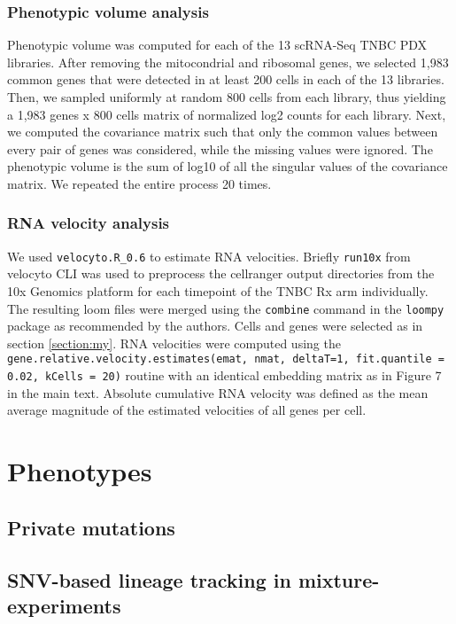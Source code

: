 \documentclass{article}
\begin{document}
\subsubsection{Phenotypic volume analysis}
\label{sec:phvolume}

Phenotypic volume \cite{azizi2018single} was computed for each of the 13 scRNA-Seq TNBC PDX libraries. After removing the mitocondrial and ribosomal genes, we selected 1,983 common genes that were detected in at least 200 cells in each of the 13 libraries. Then, we sampled uniformly at random 800 cells from each library, thus yielding a 1,983 genes x 800 cells matrix of normalized log2 counts for each library. Next, we computed the  covariance matrix such that only the common values between every pair of genes was considered, while the missing values were ignored. The phenotypic volume is the sum of log10 of all the singular values of the covariance matrix. We repeated the entire process 20 times.


\subsubsection{RNA velocity analysis}
We used \verb|velocyto.R_0.6| \cite{la2018rna} to estimate RNA velocities. 
Briefly  \verb|run10x| from velocyto CLI was used to preprocess the cellranger output directories from the 10x Genomics platform for each timepoint of the TNBC Rx arm individually. 
The resulting loom files were merged using the \verb|combine| command in the \verb|loompy| package as recommended by the authors. 
Cells and genes were selected as in section \ref{section:my}. 
RNA velocities were computed using the \verb|gene.relative.velocity.estimates(emat, nmat, deltaT=1, fit.quantile = 0.02, kCells = 20)| routine with an identical embedding matrix as in Figure 7 in the main text. 
Absolute cumulative RNA velocity was defined as the mean average magnitude of the estimated velocities of all genes per cell. 



\section{Phenotypes}
\subsection{Private mutations}
\subsection{SNV-based lineage tracking in mixture-experiments}
\end{document}
